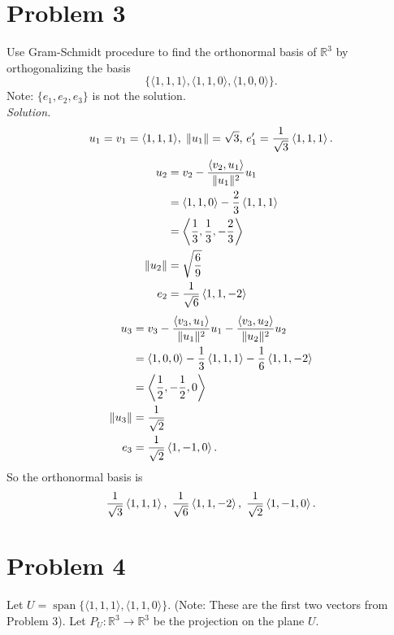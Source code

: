 \documentclass[12pt]{article}
\begin{document}
\section*{Problem 3}
Use Gram-Schmidt procedure to find the orthonormal basis of \(\mathbb{R}^{3}\) by orthogonalizing the basis 
\[
\{\langle 1, 1, 1 \rangle, \langle 1, 1, 0 \rangle, \langle 1, 0, 0 \rangle\}.
\]
Note: \(\{e_{1}, e_{2}, e_{3}\}\) is not the solution.\\
\textit{Solution.}
\[
	u_1=v_1=\langle 1,1,1\rangle,\;\| u_1 \|=\sqrt{3},\,e_1'=\frac{1}{\sqrt{3}}\left\langle 1,1,1 \right\rangle.
\]
\begin{align*}
	u_2&=v_2-\frac{\left\langle v_2, u_1 \right\rangle}{\| u_1 \|^2}u_1\\
	&=\left\langle 1,1,0 \right\rangle-\frac{2}{3}\left\langle 1,1,1 \right\rangle\\
	&=\left\langle \frac{1}{3},\frac{1}{3},-\frac{2}{3} \right\rangle\\
	\| u_2 \|&=\sqrt{\frac{6}{9}}\\
	e_2&=\frac{1}{\sqrt{6}}\left\langle 1,1,-2 \right\rangle
\end{align*}
\begin{align*}
	u_3&=v_3-\frac{\left\langle v_3, u_1 \right\rangle}{\| u_1 \|^2}u_1-\frac{\left\langle v_3, u_2 \right\rangle}{\| u_2 \|^2}u_2\\
	&=\left\langle 1,0,0 \right\rangle-\frac{1}{3}\left\langle 1,1,1 \right\rangle-\frac{1}{6}\left\langle 1,1,-2 \right\rangle\\
	&=\left\langle \frac{1}{2},-\frac{1}{2},0 \right\rangle\\
	\| u_3 \|&=\frac{1}{\sqrt{2}}\\
	e_3&=\frac{1}{\sqrt{2}}\left\langle 1,-1,0 \right\rangle.
\end{align*}
So the orthonormal basis is 
\[
	\frac{1}{\sqrt{3}}\left\langle 1,1,1 \right\rangle,\;\frac{1}{\sqrt{6}}\left\langle 1,1,-2 \right\rangle,\;\frac{1}{\sqrt{2}}\left\langle 1,-1,0 \right\rangle.
\]

\section*{Problem 4}
Let \(U = \operatorname{span}\{\langle 1, 1, 1 \rangle, \langle 1, 1, 0 \rangle\}\). (Note: These are the first two vectors from Problem 3). Let \(P_{U}: \mathbb{R}^{3} \to \mathbb{R}^{3}\) be the projection on the plane \(U\).
\end{document}
